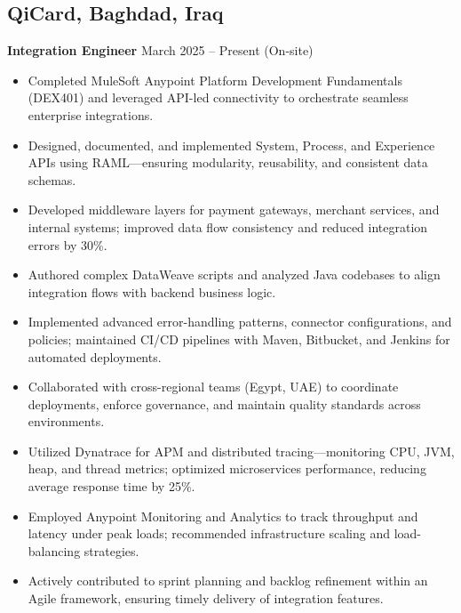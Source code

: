 \documentclass[11pt]{article}
\begin{document}
\subsection*{QiCard, Baghdad, Iraq}
\textbf{Integration Engineer} \hfill March 2025 -- Present (On-site)\\
\begin{itemize}[leftmargin=*]\itemsep0pt
  \item Completed MuleSoft Anypoint Platform Development Fundamentals (DEX401) and leveraged API-led connectivity to orchestrate seamless enterprise integrations.
  \item Designed, documented, and implemented System, Process, and Experience APIs using RAML—ensuring modularity, reusability, and consistent data schemas.
  \item Developed middleware layers for payment gateways, merchant services, and internal systems; improved data flow consistency and reduced integration errors by 30\%.
  \item Authored complex DataWeave scripts and analyzed Java codebases to align integration flows with backend business logic.
  \item Implemented advanced error-handling patterns, connector configurations, and policies; maintained CI/CD pipelines with Maven, Bitbucket, and Jenkins for automated deployments.
  \item Collaborated with cross-regional teams (Egypt, UAE) to coordinate deployments, enforce governance, and maintain quality standards across environments.
  \item Utilized Dynatrace for APM and distributed tracing—monitoring CPU, JVM, heap, and thread metrics; optimized microservices performance, reducing average response time by 25\%.
  \item Employed Anypoint Monitoring and Analytics to track throughput and latency under peak loads; recommended infrastructure scaling and load-balancing strategies.
  \item Actively contributed to sprint planning and backlog refinement within an Agile framework, ensuring timely delivery of integration features.
\end{itemize}

\vspace{0.2cm}
\end{document}
